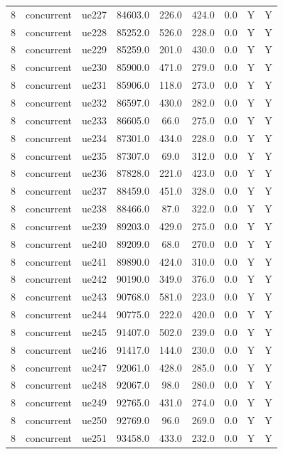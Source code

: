 \begin{table}[ht]
\begin{tabular}{|c|c|c|c|c|c|c|c|c|}
8 & concurrent & ue227 & 84603.0 & 226.0 & 424.0 & 0.0 & Y & Y \\
8 & concurrent & ue228 & 85252.0 & 526.0 & 228.0 & 0.0 & Y & Y \\
8 & concurrent & ue229 & 85259.0 & 201.0 & 430.0 & 0.0 & Y & Y \\
8 & concurrent & ue230 & 85900.0 & 471.0 & 279.0 & 0.0 & Y & Y \\
8 & concurrent & ue231 & 85906.0 & 118.0 & 273.0 & 0.0 & Y & Y \\
8 & concurrent & ue232 & 86597.0 & 430.0 & 282.0 & 0.0 & Y & Y \\
8 & concurrent & ue233 & 86605.0 & 66.0 & 275.0 & 0.0 & Y & Y \\
8 & concurrent & ue234 & 87301.0 & 434.0 & 228.0 & 0.0 & Y & Y \\
8 & concurrent & ue235 & 87307.0 & 69.0 & 312.0 & 0.0 & Y & Y \\
8 & concurrent & ue236 & 87828.0 & 221.0 & 423.0 & 0.0 & Y & Y \\
8 & concurrent & ue237 & 88459.0 & 451.0 & 328.0 & 0.0 & Y & Y \\
8 & concurrent & ue238 & 88466.0 & 87.0 & 322.0 & 0.0 & Y & Y \\
8 & concurrent & ue239 & 89203.0 & 429.0 & 275.0 & 0.0 & Y & Y \\
8 & concurrent & ue240 & 89209.0 & 68.0 & 270.0 & 0.0 & Y & Y \\
8 & concurrent & ue241 & 89890.0 & 424.0 & 310.0 & 0.0 & Y & Y \\
8 & concurrent & ue242 & 90190.0 & 349.0 & 376.0 & 0.0 & Y & Y \\
8 & concurrent & ue243 & 90768.0 & 581.0 & 223.0 & 0.0 & Y & Y \\
8 & concurrent & ue244 & 90775.0 & 222.0 & 420.0 & 0.0 & Y & Y \\
8 & concurrent & ue245 & 91407.0 & 502.0 & 239.0 & 0.0 & Y & Y \\
8 & concurrent & ue246 & 91417.0 & 144.0 & 230.0 & 0.0 & Y & Y \\
8 & concurrent & ue247 & 92061.0 & 428.0 & 285.0 & 0.0 & Y & Y \\
8 & concurrent & ue248 & 92067.0 & 98.0 & 280.0 & 0.0 & Y & Y \\
8 & concurrent & ue249 & 92765.0 & 431.0 & 274.0 & 0.0 & Y & Y \\
8 & concurrent & ue250 & 92769.0 & 96.0 & 269.0 & 0.0 & Y & Y \\
8 & concurrent & ue251 & 93458.0 & 433.0 & 232.0 & 0.0 & Y & Y \\

\end{tabular}
\end{table}
